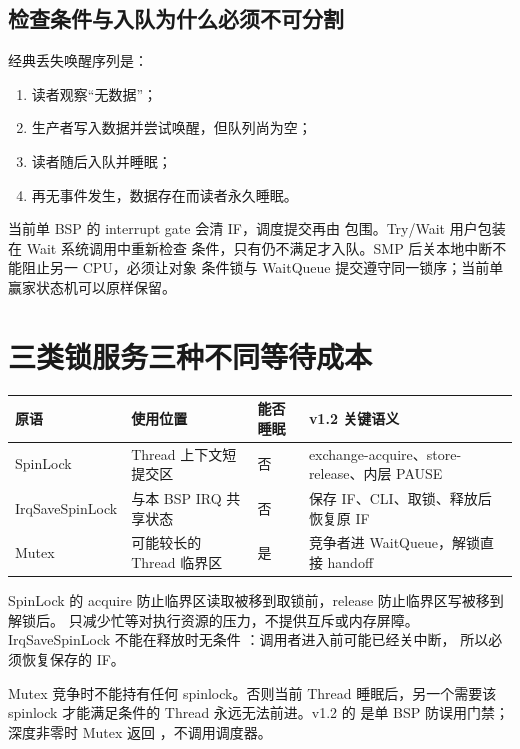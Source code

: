 \subsection{检查条件与入队为什么必须不可分割}

经典丢失唤醒序列是：

\begin{enumerate}[label=\arabic*.]
  \item 读者观察“无数据”；
  \item 生产者写入数据并尝试唤醒，但队列尚为空；
  \item 读者随后入队并睡眠；
  \item 再无事件发生，数据存在而读者永久睡眠。
\end{enumerate}

当前单 BSP 的  interrupt gate 会清 IF，调度提交再由
 包围。Try/Wait 用户包装在 Wait 系统调用中重新检查
条件，只有仍不满足才入队。SMP 后关本地中断不能阻止另一 CPU，必须让对象
条件锁与 WaitQueue 提交遵守同一锁序；当前单赢家状态机可以原样保留。

\section{三类锁服务三种不同等待成本}

\begin{longtable}{L{0.22\textwidth}L{0.25\textwidth}L{0.18\textwidth}L{0.23\textwidth}}
\toprule
原语 & 使用位置 & 能否睡眠 & v1.2 关键语义\\
\midrule
SpinLock & Thread 上下文短提交区 & 否 & exchange-acquire、store-release、内层 PAUSE\\
IrqSaveSpinLock & 与本 BSP IRQ 共享状态 & 否 & 保存 IF、CLI、取锁、释放后恢复原 IF\\
Mutex & 可能较长的 Thread 临界区 & 是 & 竞争者进 WaitQueue，解锁直接 handoff\\
\bottomrule
\end{longtable}

SpinLock 的 acquire 防止临界区读取被移到取锁前，release 防止临界区写被移到
解锁后。 只减少忙等对执行资源的压力，不提供互斥或内存屏障。
IrqSaveSpinLock 不能在释放时无条件 ：调用者进入前可能已经关中断，
所以必须恢复保存的 IF。

Mutex 竞争时不能持有任何 spinlock。否则当前 Thread 睡眠后，另一个需要该
spinlock 才能满足条件的 Thread 永远无法前进。v1.2 的
 是单 BSP 防误用门禁；深度非零时 Mutex 返回
，不调用调度器。

